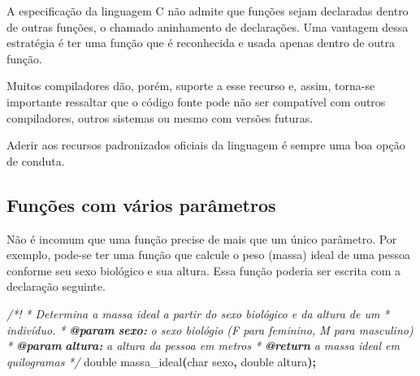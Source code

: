 \documentclass[
  11pt,
  a4paper,
]{scrbook}
\newenvironment{Shaded}{\begin{snugshade}}{\end{snugshade}}
\newcommand{\AnnotationTok}[1]{\textcolor[rgb]{0.56,0.35,0.01}{\textbf{\textit{#1}}}}
\newcommand{\CommentTok}[1]{\textcolor[rgb]{0.56,0.35,0.01}{\textit{#1}}}
\newcommand{\CommentVarTok}[1]{\textcolor[rgb]{0.56,0.35,0.01}{\textbf{\textit{#1}}}}
\newcommand{\DataTypeTok}[1]{\textcolor[rgb]{0.13,0.29,0.53}{#1}}
\newcommand{\NormalTok}[1]{#1}
\newcommand{\OperatorTok}[1]{\textcolor[rgb]{0.81,0.36,0.00}{\textbf{#1}}}
\begin{document}
\begin{tcolorbox}[enhanced jigsaw, arc=.35mm, bottomtitle=1mm, colbacktitle=quarto-callout-caution-color!10!white, title=\textcolor{quarto-callout-caution-color}{\faFire}\hspace{0.5em}{Cuidado}, toprule=.15mm, left=2mm, opacityback=0, colback=white, colframe=quarto-callout-caution-color-frame, opacitybacktitle=0.6, bottomrule=.15mm, leftrule=.75mm, toptitle=1mm, coltitle=black, titlerule=0mm, rightrule=.15mm, breakable]

A especificação da linguagem C não admite que funções sejam declaradas
dentro de outras funções, o chamado aninhamento de declarações. Uma
vantagem dessa estratégia é ter uma função que é reconhecida e usada
apenas dentro de outra função.

Muitos compiladores dão, porém, suporte a esse recurso e, assim,
torna-se importante ressaltar que o código fonte pode não ser compatível
com outros compiladores, outros sistemas ou mesmo com versões futuras.

Aderir aos recursos padronizados oficiais da linguagem é sempre uma boa
opção de conduta.

\end{tcolorbox}

\subsection{Funções com vários
parâmetros}\label{funuxe7uxf5es-com-vuxe1rios-paruxe2metros}

Não é incomum que uma função precise de mais que um único parâmetro. Por
exemplo, pode-se ter uma função que calcule o peso (massa) ideal de uma
pessoa conforme seu sexo biológico e sua altura. Essa função poderia ser
escrita com a declaração seguinte.

\begin{Shaded}
\begin{Highlighting}[]
\CommentTok{/*!}
\CommentTok{ * Determina a massa ideal a partir do sexo biológico e da altura de um}
\CommentTok{ * indivíduo.}
\CommentTok{ * }\AnnotationTok{@param}\CommentTok{ }\CommentVarTok{sexo:}\CommentTok{ o sexo biológio (\textquotesingle{}F\textquotesingle{} para feminino, \textquotesingle{}M\textquotesingle{} para masculino) }
\CommentTok{ * }\AnnotationTok{@param}\CommentTok{ }\CommentVarTok{altura:}\CommentTok{ a altura da pessoa em metros}
\CommentTok{ * }\AnnotationTok{@return}\CommentTok{ a massa ideal em quilogramas}
\CommentTok{ */}
\DataTypeTok{double}\NormalTok{ massa\_ideal}\OperatorTok{(}\DataTypeTok{char}\NormalTok{ sexo}\OperatorTok{,} \DataTypeTok{double}\NormalTok{ altura}\OperatorTok{);}
\end{Highlighting}
\end{Shaded}
\end{document}
